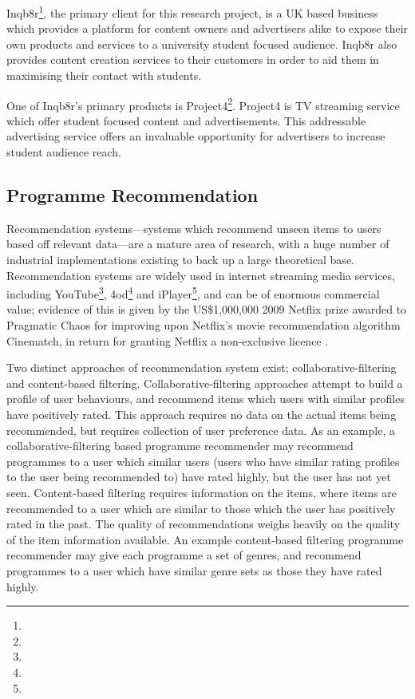 	Inqb8r\footnote{}, the primary client for this research project, is a UK based business which provides a platform for content owners and advertisers alike to expose their own products and services to a university student focused audience. Inqb8r also provides content creation services to their customers in order to aid them in maximising their contact with students.

	One of Inqb8r's primary products is Project4\footnote{}. Project4 is TV streaming service which offer student focused content and advertisements. This addressable advertising service offers an invaluable opportunity for advertisers to increase student audience reach.

	\subsection{Programme Recommendation}

	Recommendation systems---systems which recommend unseen items to users based off relevant data---are a mature area of research, with a huge number of industrial implementations existing to back up a large theoretical base. Recommendation systems are widely used in internet streaming media services, including YouTube\footnote{}, 4od\footnote{} and iPlayer\footnote{}, and can be of enormous commercial value; evidence of this is given by the US\$1,000,000 2009 Netflix prize awarded to Pragmatic Chaos for improving upon Netflix's movie recommendation algorithm Cinematch, in return for granting Netflix a non-exclusive licence \citep{pragmatic_chaos}.

	Two distinct approaches of recommendation system exist; collaborative-filtering and content-based filtering. Collaborative-filtering approaches attempt to build a profile of user behaviours, and recommend items which users with similar profiles have positively rated. This approach requires no data on the actual items being recommended, but requires collection of user preference data. As an example, a collaborative-filtering based programme recommender may recommend programmes to a user which similar users (users who have similar rating profiles to the user being recommended to) have rated highly, but the user has not yet seen. Content-based filtering requires information on the items, where items are recommended to a user which are similar to those which the user has positively rated in the past. The quality of recommendations weighs heavily on the quality of the item information available. An example content-based filtering programme recommender may give each programme a set of genres, and recommend programmes to a user which have similar genre sets as those they have rated highly.

